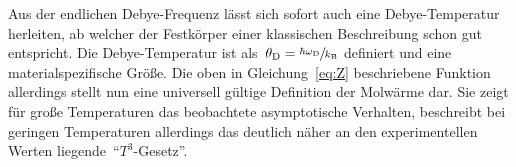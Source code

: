 %
Aus der endlichen Debye-Frequenz lässt sich sofort auch eine Debye-Temperatur
herleiten, ab welcher der Festkörper einer klassischen Beschreibung schon gut
entspricht. Die Debye-Temperatur ist
als~$\theta_{\mathrm{D}}=\sfrac{\hbar\omega_{\mathrm{D}}}{k_{\mathrm{B}}}$
definiert und eine materialspezifische Größe. Die oben in Gleichung~\eqref{eq:Z}
beschriebene Funktion allerdings stellt nun eine universell gültige Definition
der Molwärme dar. Sie zeigt für große Temperaturen das beobachtete asymptotische
Verhalten, beschreibt bei geringen Temperaturen allerdings das deutlich näher an
den experimentellen Werten liegende~\enquote{$T^3$-Gesetz}.